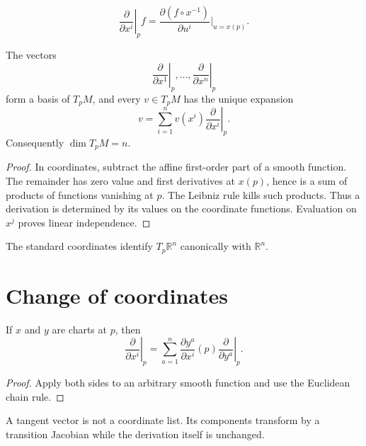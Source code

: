 \begin{definition}\label{def:vii04-coordinate-derivations}
\[
\left.\frac{\partial}{\partial x^i}\right|_p f
=
\frac{\partial(f\circ x^{-1})}{\partial u^i}\bigg|_{u=x(p)}.
\]
\end{definition}

\begin{theorem}\label{thm:vii04-coordinate-basis}
The vectors
\[
\left.\frac{\partial}{\partial x^1}\right|_p,\dots,
\left.\frac{\partial}{\partial x^n}\right|_p
\]
form a basis of \(T_pM\), and every \(v\in T_pM\) has the unique expansion
\[
v=\sum_{i=1}^n v(x^i)\left.\frac{\partial}{\partial x^i}\right|_p.
\]
Consequently \(\dim T_pM=n\).
\end{theorem}
\begin{proof}
In coordinates, subtract the affine first-order part of a smooth function. The remainder has zero value and first derivatives at \(x(p)\), hence is a sum of products of functions vanishing at \(p\). The Leibniz rule kills such products. Thus a derivation is determined by its values on the coordinate functions. Evaluation on \(x^j\) proves linear independence.
\end{proof}

\begin{corollary}\label{cor:vii04-euclidean}
The standard coordinates identify \(T_p\mathbb R^n\) canonically with \(\mathbb R^n\).
\end{corollary}

\section{Change of coordinates}
\begin{theorem}\label{thm:vii04-transformation}
If \(x\) and \(y\) are charts at \(p\), then
\[
\left.\frac{\partial}{\partial x^i}\right|_p
=
\sum_{a=1}^n
\frac{\partial y^a}{\partial x^i}(p)
\left.\frac{\partial}{\partial y^a}\right|_p.
\]
\end{theorem}
\begin{proof}
Apply both sides to an arbitrary smooth function and use the Euclidean chain rule.
\end{proof}

\begin{remark}\label{rem:vii04-intrinsic}
A tangent vector is not a coordinate list. Its components transform by a transition Jacobian while the derivation itself is unchanged.
\end{remark}

